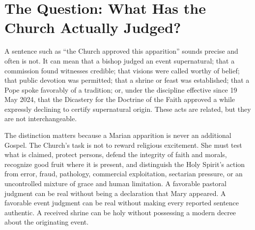 \section{The Question: What Has the Church Actually Judged?}

A sentence such as ``the Church approved this apparition'' sounds precise and often is not. It can mean that a bishop judged an event supernatural; that a commission found witnesses credible; that visions were called worthy of belief; that public devotion was permitted; that a shrine or feast was established; that a Pope spoke favorably of a tradition; or, under the discipline effective since 19 May 2024, that the Dicastery for the Doctrine of the Faith approved a  while expressly declining to certify supernatural origin. These acts are related, but they are not interchangeable.

The distinction matters because a Marian apparition is never an additional Gospel. The Church's task is not to reward religious excitement. She must test what is claimed, protect persons, defend the integrity of faith and morals, recognize good fruit where it is present, and distinguish the Holy Spirit's action from error, fraud, pathology, commercial exploitation, sectarian pressure, or an uncontrolled mixture of grace and human limitation. A favorable pastoral judgment can be real without being a declaration that Mary appeared. A favorable event judgment can be real without making every reported sentence authentic. A received shrine can be holy without possessing a modern decree about the originating event.


